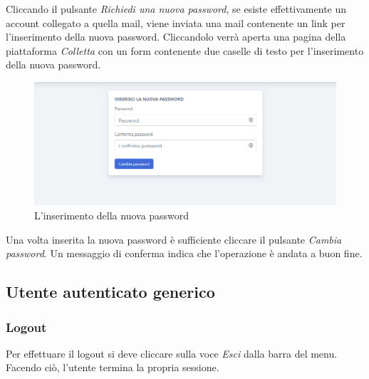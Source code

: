 	Cliccando il pulsante \textit{Richiedi una nuova password}, se esiste effettivamente un account collegato a 	quella mail, viene inviata una mail contenente un link per l'inserimento della nuova password. Cliccandolo verrà aperta una pagina della piattaforma \textit{Colletta} con un form contenente due caselle di testo per l'inserimento della nuova password.
	
\begin{figure}[H]
        	\centering
        	\includegraphics[width=1\linewidth]{sez/img/autenticazione/password.png} 
        	\caption{L'inserimento della nuova password}\label{fig:1}
    	\end{figure}	

Una volta inserita la nuova password è sufficiente cliccare il pulsante \textit{Cambia password}. Un messaggio di conferma indica che l'operazione è andata a buon fine.	
	
\subsection{Utente autenticato generico}

    \subsubsection{Logout}
    Per effettuare il {logout} si deve cliccare sulla voce \textit{Esci} dalla barra del menu. Facendo ciò, l'utente termina la propria sessione.
